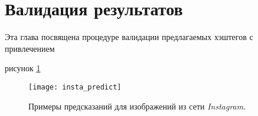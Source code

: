 \section{Валидация результатов}


\indent
\indent
Эта глава посвящена процедуре валидации предлагаемых 
хэштегов с привлечением


рисунок \ref{tikzpicture: insta_predict}

\begin{figure}[h!]
    \begin{center}
   	    \texttt{[image: insta\_predict]}
   	\end{center}
   	\caption{Примеры предсказаний для изображений из сети \textit{Instagram}.}
   	\label{tikzpicture: insta_predict}
\end{figure}
